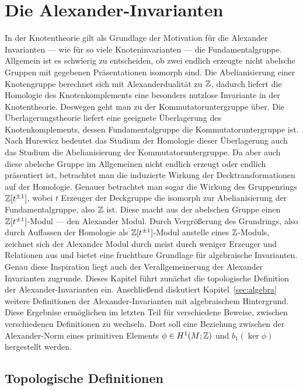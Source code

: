 
\section{Die Alexander-Invarianten}

        In der Knotentheorie gilt als Grundlage der Motivation für die Alexander Invarianten --- wie für so viele Knoteninvarianten --- die Fundamentalgruppe. Allgemein ist es schwierig zu entscheiden, ob zwei endlich erzeugte nicht abelsche Gruppen mit gegebenen Präsentationen isomorph sind. Die Abelianisierung einer Knotengruppe berechnet sich mit Alexanderdualität zu $\mathbb{Z}$, dadurch liefert die Homologie des Knotenkomplements eine besonders nutzlose Invariante in der Knotentheorie. Deswegen geht man zu der Kommutatoruntergruppe über. Die Überlagerungstheorie liefert eine geeignete Überlagerung des Knotenkomplements, dessen Fundamentalgruppe die Kommutatoruntergruppe ist. Nach Hurewicz bedeutet das Studium der Homologie dieser Überlagerung auch das Studium die Abelianisierung der Kommutatoruntergruppe. Da aber auch diese abelsche Gruppe im Allgemeinen nicht endlich erzeugt oder endlich präsentiert ist, betrachtet man die induzierte Wirkung der Decktransformationen auf der Homologie. Genauer betrachtet man sogar die Wirkung des Gruppenrings $\mathbb{Z} [t^{\pm 1}]$, wobei $t$ Erzeuger der Deckgruppe die isomorph zur Abelianisierung der Fundamentalgruppe, also $\mathbb{Z}$ ist. Diese macht aus der abelschen Gruppe einen $\mathbb{Z} [t^{\pm 1}]$-Modul --- den Alexander Modul. Durch Vergrößerung des Grundrings, also durch Auffassen der Homologie als $\mathbb{Z}[t^{\pm 1}]$-Modul anstelle eines $\mathbb{Z}$-Moduls, zeichnet sich der Alexander Modul durch meist durch weniger Erzeuger und Relationen aus und bietet eine fruchtbare Grundlage für algebraische Invarianten. Genau diese Inspiration liegt auch der Verallgemeinerung der Alexander Invarianten zugrunde.
        Dieses Kapitel führt zunächst die topologische Definition der Alexander-Invarianten ein. Anschließend diskutiert Kapitel~\ref{sec:algebra} weitere Definitionen der Alexander-Invarianten mit algebraischem Hintergrund. Diese Ergebnise ermöglichen im letzten Teil für verschiedene Beweise, zwischen verschiedenen Definitionen zu wechseln. Dort soll eine Beziehung zwischen der Alexander-Norm eines primitiven Elements $\phi\in H^1(M;\mathbb{Z})$ und $b_1(\ker\phi)$ hergestellt werden.
    

   \subsection{Topologische Definitionen}
       \label{sec:alexdefs}

